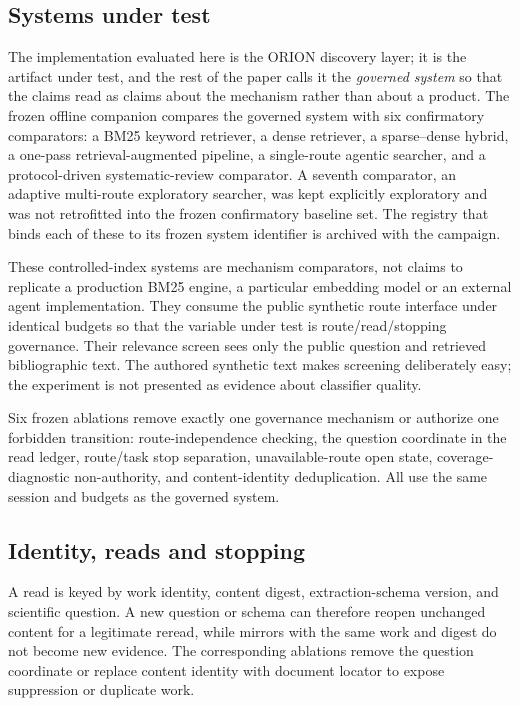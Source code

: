 \subsection{Systems under test}
The implementation evaluated here is the ORION discovery layer; it is the
artifact under test, and the rest of the paper calls it the \emph{governed
system} so that the claims read as claims about the mechanism rather than about
a product.  The frozen offline companion compares the governed system with six
confirmatory comparators: a BM25 keyword retriever, a dense retriever, a
sparse--dense hybrid, a one-pass retrieval-augmented pipeline, a single-route
agentic searcher, and a protocol-driven systematic-review comparator.  A seventh
comparator, an adaptive multi-route exploratory searcher, was kept explicitly
exploratory and was not retrofitted into the frozen confirmatory baseline set.
The registry that binds each of these to its frozen system identifier is
archived with the campaign.

These controlled-index systems are mechanism comparators, not claims to
replicate a production BM25 engine, a particular embedding model or an external
agent implementation.  They consume the public synthetic route interface under
identical budgets so that the variable under test is route/read/stopping
governance.  Their relevance screen sees only the public question and retrieved
bibliographic text.  The authored synthetic text makes screening deliberately
easy; the experiment is not presented as evidence about classifier quality.

Six frozen ablations remove exactly one governance mechanism or authorize one
forbidden transition: route-independence checking, the question coordinate in
the read ledger, route/task stop separation, unavailable-route open state,
coverage-diagnostic non-authority, and content-identity deduplication.  All use
the same session and budgets as the governed system.

\subsection{Identity, reads and stopping}
A read is keyed by work identity, content digest, extraction-schema version,
and scientific question. A new question or schema can therefore reopen
unchanged content for a legitimate reread, while mirrors with the same work and
digest do not become new evidence. The corresponding ablations remove the
question coordinate or replace content identity with document locator to expose
suppression or duplicate work.

